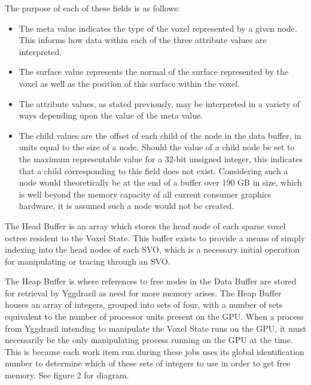 \documentclass[onecolumn, draftclsnofoot,10pt, compsoc]{IEEEtran}
\newcounter{threesection}[subsubsection]
\newcounter{foursection}[threesection]
\begin{document}
The purpose of each of these fields is as follows:

\begin{itemize}

\item The meta value indicates the type of the voxel represented by a given node. This informs how data within each of the three attribute values are interpreted.
\item The surface value represents the normal of the surface represented by the voxel as well as the position of this surface within the voxel.
\item The attribute values, as stated previously, may be interpreted in a variety of ways depending upon the value of the meta value.
\item The child values are the offset of each child of the node in the data buffer, in units equal to the size of a node. Should the value of a child node be set to the maximum representable value for a 32-bit unsigned integer, this indicates that a child corresponding to this field does not exist. Considering such a node would theoretically be at the end of a buffer over 190 GB in size, which is well beyond the memory capacity of all current consumer graphics hardware, it is assumed such a node would not be created.
\end{itemize}



The Head Buffer is an array which stores the head node of each sparse voxel octree resident to the Voxel State.
This buffer exists to provide a means of simply indexing into the head nodes of each SVO, which is a necessary initial operation for manipulating or tracing through an SVO.\\



The Heap Buffer is where references to free nodes in the Data Buffer are stored for retrieval by Yggdrasil as need for more memory arises.
The Heap Buffer houses an array of integers, grouped into sets of four, with a number of sets equivalent to the number of processor units present on the GPU.
When a process from Yggdrasil intending to manipulate the Voxel State runs on the GPU, it must necessarily be the only manipulating process running on the GPU at the time.
This is because each work item run during these jobs uses its global identification number to determine which of these sets of integers to use in order to get free memory.
See figure 2 for diagram.
\end{document}
